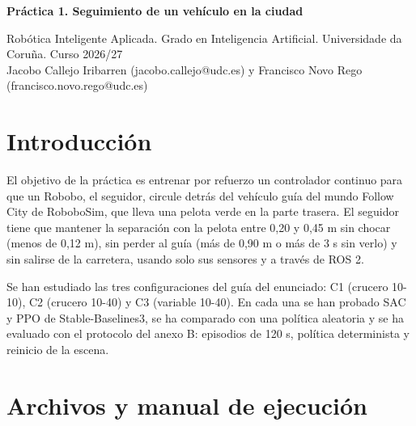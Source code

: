 \documentclass[11pt,a4paper]{article}
\begin{document}
{\Large\bfseries Práctica 1. Seguimiento de un vehículo en la ciudad\par}
\vspace{2pt}
{\small Robótica Inteligente Aplicada. Grado en Inteligencia Artificial. Universidade da Coruña. Curso 2026/27\\
Jacobo Callejo Iribarren (jacobo.callejo@udc.es) y Francisco Novo Rego (francisco.novo.rego@udc.es)\par}

\section{Introducción}

El objetivo de la práctica es entrenar por refuerzo un controlador continuo para que un Robobo, el seguidor,
circule detrás del vehículo guía del mundo Follow City de RoboboSim, que lleva una pelota verde en la parte
trasera. El seguidor tiene que mantener la separación con la pelota entre 0,20 y 0,45 m sin chocar (menos de
0,12 m), sin perder al guía (más de 0,90 m o más de 3 s sin verlo) y sin salirse de la carretera, usando solo
sus sensores y a través de ROS 2.

Se han estudiado las tres configuraciones del guía del enunciado: C1 (crucero 10-10), C2 (crucero 10-40) y C3
(variable 10-40). En cada una se han probado SAC y PPO de Stable-Baselines3, se ha comparado con una política
aleatoria y se ha evaluado con el protocolo del anexo B: episodios de 120 s, política determinista y reinicio
de la escena.

\section{Archivos y manual de ejecución}
\end{document}

